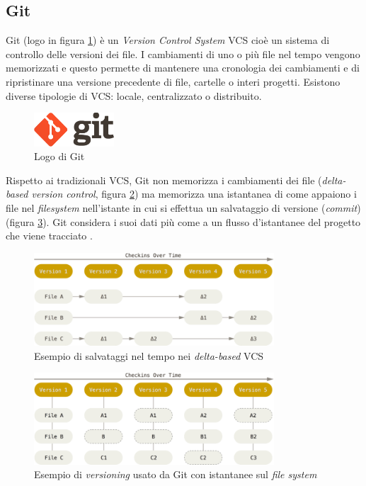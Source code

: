 \subsection{Git}
Git (logo in figura \ref{fig:gitLogo}) è un \textit{Version Control System} VCS cioè un sistema di controllo delle versioni dei file. I cambiamenti di uno o più file nel tempo vengono memorizzati e questo permette di mantenere una cronologia dei cambiamenti e di ripristinare una versione precedente di file, cartelle o interi progetti.
Esistono diverse tipologie di VCS: locale, centralizzato o distribuito.
\begin{figure}
    \centering
    \includegraphics[width=3cm]{img/gitlogo.png}
    \caption{Logo di Git}
    \label{fig:gitLogo}
\end{figure}
Rispetto ai tradizionali VCS, Git non memorizza i cambiamenti dei file (\textit{delta-based version control}, figura \ref{fig:deltaVCS}) ma memorizza una istantanea di come appaiono i file nel \textit{filesystem} nell'istante in cui si effettua un salvataggio di versione (\textit{commit}) (figura \ref{fig:snapshotVCS}). Git considera i suoi dati più come a un flusso d'istantanee del progetto che viene tracciato \cite{gitSite}.

\begin{figure}
    \centering
    \includegraphics[width=0.8\textwidth]{img/deltasVCS.png}
    \caption{Esempio di salvataggi nel tempo nei \textit{delta-based} VCS}
    \label{fig:deltaVCS}
\end{figure}
\begin{figure}
    \centering
    \includegraphics[width=0.8\textwidth]{img/snapshotsVCS.png}
    \caption{Esempio di \textit{versioning} usato da Git con istantanee sul \textit{file system}}
    \label{fig:snapshotVCS}
\end{figure}
%
